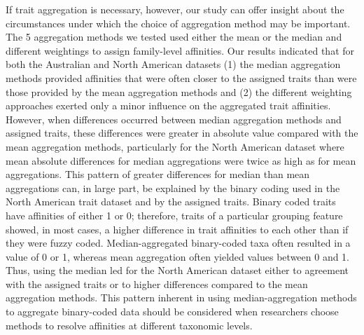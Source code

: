 \documentclass{article}
\begin{document}
If trait aggregation is necessary, however, our study can offer insight about the circumstances under which the choice of aggregation method may be important. The 5 aggregation methods we tested used either the mean or the median and different weightings to assign family-level affinities. Our results indicated that for both the Australian and North American datasets (1) the median aggregation methods provided affinities that were often closer to the assigned traits than were those provided by the mean aggregation methods and (2) the different weighting approaches exerted only a minor influence on the aggregated trait affinities. However, when differences occurred between median aggregation methods and assigned traits, these differences were greater in absolute value compared with the mean aggregation methods, particularly for the North American dataset where mean absolute differences for median aggregations were twice as high as for mean aggregations. This pattern of greater differences for median than mean aggregations can, in large part, be explained by the binary coding used in the North American trait dataset and by the assigned traits. Binary coded traits have affinities of either 1 or 0; therefore, traits of a particular grouping feature showed, in most cases, a higher difference in trait affinities to each other than if they were fuzzy coded. Median-aggregated binary-coded taxa often resulted in a value of 0 or 1, whereas mean aggregation often yielded values between 0 and 1.
Thus, using the median led for the North American dataset either to agreement with the assigned traits or to higher differences compared to the mean aggregation methods. This pattern inherent in using median-aggregation methods to aggregate binary-coded data should be considered when researchers choose methods to resolve affinities at different taxonomic levels. 
\end{document}
